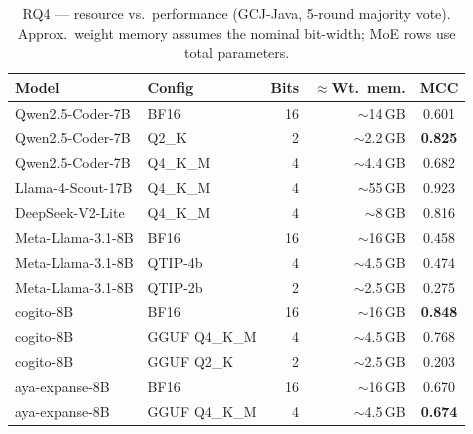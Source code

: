 \documentclass[11pt]{article}
\newcommand{\best}[1]{\textbf{#1}}
\begin{document}
\begin{table}[htbp]
  \centering
  \caption{RQ4 --- resource vs.\ performance (GCJ-Java, 5-round majority vote).
           Approx.\ weight memory assumes the nominal bit-width; MoE rows use
           total parameters.}
  \label{tab:rq4}
  \small
  \begin{tabular}{llrrc}
    \toprule
    \textbf{Model} & \textbf{Config} & \textbf{Bits} & \textbf{$\approx$Wt.\ mem.} & \textbf{MCC} \\
    \midrule
    Qwen2.5-Coder-7B   & BF16       & 16 & $\sim$14\,GB & 0.601 \\
    Qwen2.5-Coder-7B   & Q2\_K      &  2 & $\sim$2.2\,GB & \best{0.825} \\
    Qwen2.5-Coder-7B   & Q4\_K\_M   &  4 & $\sim$4.4\,GB & 0.682 \\
    \midrule
    Llama-4-Scout-17B  & Q4\_K\_M   &  4 & $\sim$55\,GB & 0.923 \\
    DeepSeek-V2-Lite   & Q4\_K\_M   &  4 & $\sim$8\,GB  & 0.816 \\
    \midrule
    Meta-Llama-3.1-8B  & BF16       & 16 & $\sim$16\,GB & 0.458 \\
    Meta-Llama-3.1-8B  & QTIP-4b    &  4 & $\sim$4.5\,GB & 0.474 \\
    Meta-Llama-3.1-8B  & QTIP-2b    &  2 & $\sim$2.5\,GB & 0.275 \\
    \midrule
    cogito-8B          & BF16          & 16 & $\sim$16\,GB & \best{0.848} \\
    cogito-8B          & GGUF Q4\_K\_M &  4 & $\sim$4.5\,GB & 0.768 \\
    cogito-8B          & GGUF Q2\_K    &  2 & $\sim$2.5\,GB & 0.203 \\
    \midrule
    aya-expanse-8B     & BF16       & 16 & $\sim$16\,GB & 0.670 \\
    aya-expanse-8B     & GGUF Q4\_K\_M &  4 & $\sim$4.5\,GB & \best{0.674} \\
    \bottomrule
  \end{tabular}
\end{table}
\end{document}
